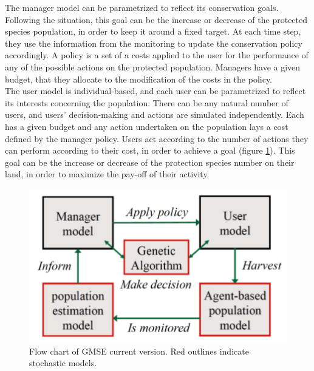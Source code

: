 \documentclass[12pt,a4paper]{article}
\begin{document}
The manager model can be parametrized to reflect its conservation goals.
Following the situation, this goal can be the increase or decrease of the protected species population, in order to keep it around a fixed target.
At each time step, they use the information from the monitoring to update the conservation policy accordingly.
A policy is a set of a costs applied to the user for the performance of any of the possible actions on the protected population.
Managers have a given budget, that they allocate to the modification of the costs in the policy.\\
The user model is individual-based, and each user can be parametrized to reflect its interests concerning the population.
There can be any natural number of users, and users' decision-making and actions are simulated independently.
Each has a given budget and any action undertaken on the population lays a cost defined by the manager policy.
Users act according to the number of actions they can perform according to their cost, in order to achieve a goal (figure \ref{gmse-diagram}).
This goal can be the increase or decrease of the protection species number on their land, in order to maximize the pay-off of their activity.
\begin{figure}
	\centering
	\includegraphics[scale=0.35]{gmse-diagram.png}
	\caption{Flow chart of GMSE current version. Red outlines indicate stochastic models.}
	\label{gmse-diagram}
\end{figure}
\end{document}
